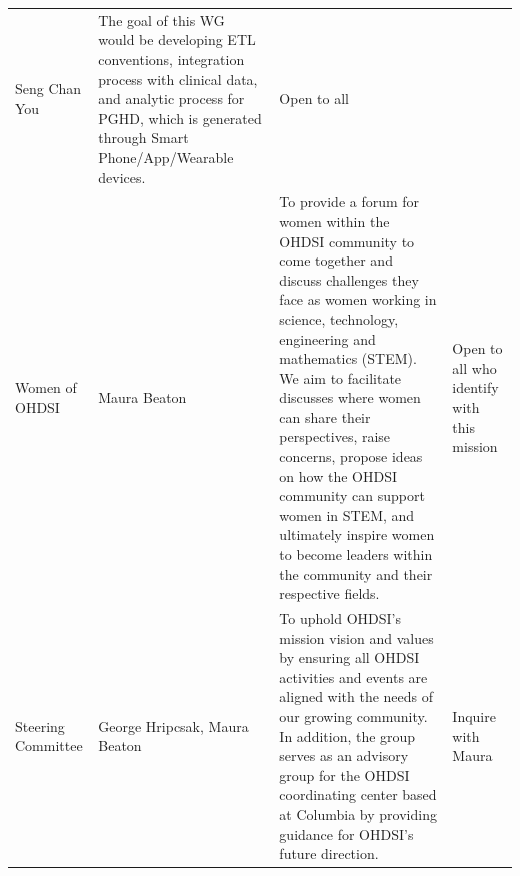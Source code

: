 \documentclass[11pt]{book}
\theoremstyle{definition}
\theoremstyle{definition}
\theoremstyle{definition}
\theoremstyle{remark}
\begin{document}
\begin{longtable}[]{@{}llll@{}}
\begin{minipage}[t]{0.22\columnwidth}
Seng Chan You\strut
\end{minipage} & \begin{minipage}[t]{0.22\columnwidth}\raggedright
The goal of this WG would be developing ETL conventions, integration process with clinical data, and analytic process for PGHD, which is generated through Smart Phone/App/Wearable devices.\strut
\end{minipage} & \begin{minipage}[t]{0.22\columnwidth}\raggedright
Open to all\strut
\end{minipage}\tabularnewline
\begin{minipage}[t]{0.22\columnwidth}\raggedright
Women of OHDSI\strut
\end{minipage} & \begin{minipage}[t]{0.22\columnwidth}\raggedright
Maura Beaton\strut
\end{minipage} & \begin{minipage}[t]{0.22\columnwidth}\raggedright
To provide a forum for women within the OHDSI community to come together and discuss challenges they face as women working in science, technology, engineering and mathematics (STEM). We aim to facilitate discusses where women can share their perspectives, raise concerns, propose ideas on how the OHDSI community can support women in STEM, and ultimately inspire women to become leaders within the community and their respective fields.\strut
\end{minipage} & \begin{minipage}[t]{0.22\columnwidth}\raggedright
Open to all who identify with this mission\strut
\end{minipage}\tabularnewline
\begin{minipage}[t]{0.22\columnwidth}\raggedright
Steering Committee\strut
\end{minipage} & \begin{minipage}[t]{0.22\columnwidth}\raggedright
George Hripcsak, Maura Beaton\strut
\end{minipage} & \begin{minipage}[t]{0.22\columnwidth}\raggedright
To uphold OHDSI's mission vision and values by ensuring all OHDSI activities and events are aligned with the needs of our growing community. In addition, the group serves as an advisory group for the OHDSI coordinating center based at Columbia by providing guidance for OHDSI's future direction.\strut
\end{minipage} & \begin{minipage}[t]{0.22\columnwidth}\raggedright
Inquire with Maura\strut
\end{minipage}\tabularnewline
\bottomrule
\end{longtable}
\end{document}
